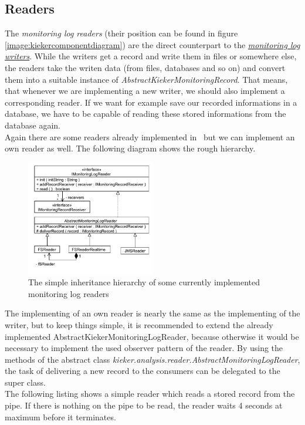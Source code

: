 \documentclass[a4paper, oneside, 11pt]{scrartcl}
\begin{document}
      \subsection{Readers}
	The \textit{monitoring log readers} (their position can be found in figure \ref{image:kiekercomponentdiagram}) are the direct counterpart to the \hyperlink{monitoringlogwriters}{\textit{monitoring log writers}}. While the writers get a record and write them in files or somewhere else, the readers take the writen data (from files, databases and so on) and convert them into a suitable instance of \textit{AbstractKiekerMonitoringRecord}. That means, that whenever we are implementing a new writer, we should also implement a corresponding reader. If we want for example save our recorded informations in a database, we have to be capable of reading these stored informations from the database again.\\
	Again there are some readers already implemented in \Kieker\ but we can implement an own reader as well. The following diagram shows the rough hierarchy.
	\begin{figure}[H]
	  \begin{center}
	    \includegraphics[width=0.5\textwidth]{kieker_readerimpls.pdf}
	    \caption{The simple inheritance hierarchy of some currently implemented monitoring log readers}
	    \label{image:readers}
	  \end{center}
	\end{figure}
	The implementing of an own reader is nearly the same as the implementing of the writer, but to keep things simple, it is recommended to extend the already implemented AbstractKiekerMonitoringLogReader, because otherwise it would be necessary to implement the used observer pattern of the reader. By using the methods of the abstract class \textit{kieker.analysis.reader.AbstractMonitoringLogReader}, the task of delivering a new record to the consumers can be delegated to the super class.\\
	The following listing shows a simple reader which reads a stored record from the pipe. If there is nothing on the pipe to be read, the reader waits 4 seconds at maximum before it terminates.
	\setJavaCodeListing
	\lstset{caption=MyReader.java}
	
\end{document}
